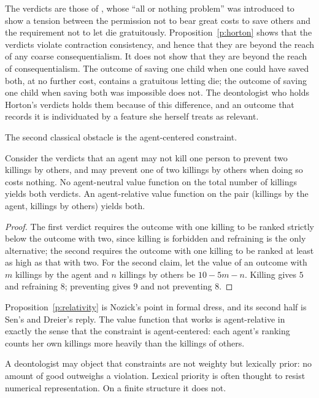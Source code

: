 \documentclass{situationist-preprint}
\begin{document}
The verdicts are those of \citet{Horton2017}, whose ``all or nothing problem'' was introduced to show a tension between the permission not to bear great costs to save others and the requirement not to let die gratuitously. Proposition~\ref{p:horton} shows that the verdicts violate contraction consistency, and hence that they are beyond the reach of any coarse consequentialism. It does not show that they are beyond the reach of consequentialism. The outcome of saving one child when one could have saved both, at no further cost, contains a gratuitous letting die; the outcome of saving one child when saving both was impossible does not. The deontologist who holds Horton's verdicts holds them because of this difference, and an outcome that records it is individuated by a feature she herself treats as relevant.

The second classical obstacle is the agent-centered constraint.

\begin{proposition}\label{p:relativity}
Consider the verdicts that an agent may not kill one person to prevent two killings by others, and may prevent one of two killings by others when doing so costs nothing. No agent-neutral value function on the total number of killings yields both verdicts. An agent-relative value function on the pair (killings by the agent, killings by others) yields both.
\end{proposition}

\begin{proof}
The first verdict requires the outcome with one killing to be ranked strictly below the outcome with two, since killing is forbidden and refraining is the only alternative; the second requires the outcome with one killing to be ranked at least as high as that with two. For the second claim, let the value of an outcome with $m$ killings by the agent and $n$ killings by others be $10 - 5m - n$. Killing gives $5$ and refraining $8$; preventing gives $9$ and not preventing $8$.
\end{proof}

Proposition~\ref{p:relativity} is Nozick's point in formal dress, and its second half is Sen's and Dreier's reply. The value function that works is agent-relative in exactly the sense that the constraint is agent-centered: each agent's ranking counts her own killings more heavily than the killings of others.

A deontologist may object that constraints are not weighty but lexically prior: no amount of good outweighs a violation. Lexical priority is often thought to resist numerical representation. On a finite structure it does not.
\end{document}
